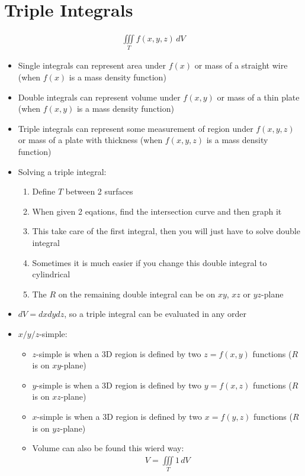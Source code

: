 \documentclass{article}
\begin{document}
\section{Triple Integrals}
\begin{align}
  \iiint\limits_T f(x,y,z) \, dV
\end{align}
\begin{itemize}
  \item Single integrals can represent area under $f(x)$ or mass of a straight wire (when $f(x)$ is a mass density function)
  \item Double integrals can represent volume under $f(x,y)$ or mass of a thin plate (when $f(x,y)$ is a mass density function)
  \item Triple integrals can represent some measurement of region under $f(x,y,z)$ or mass of a plate with thickness (when $f(x,y,z)$ is a mass density function)
  \item Solving a triple integral:
  \begin{enumerate}
    \item Define $T$ between 2 surfaces
    \item When given 2 eqations, find the intersection curve and then graph it
    \item This take care of the first integral, then you will just have to solve double integral
    \item Sometimes it is much easier if you change this double integral to cylindrical
    \item The $R$ on the remaining double integral can be on $xy$, $xz$ or $yz$-plane
  \end{enumerate}
  \item $dV = dxdydz$, so a triple integral can be evaluated in any order
  \item $x/y/z$-simple:
  \begin{itemize}
    \item $z$-simple is when a 3D region is defined by two $z = f(x,y)$ functions ($R$ is on $xy$-plane)
    \item $y$-simple is when a 3D region is defined by two $y = f(x,z)$ functions ($R$ is on $xz$-plane)
    \item $x$-simple is when a 3D region is defined by two $x = f(y,z)$ functions ($R$ is on $yz$-plane)
    \item Volume can also be found this wierd way:
    \begin{align}
      V = \iiint\limits_T 1 \, dV
    \end{align}

\end{itemize}
\end{itemize}
\end{document}
